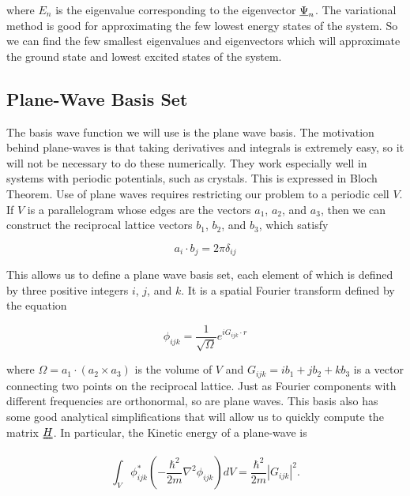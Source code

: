 \documentclass[12pt, a4paper, twocolumn]{article}
\begin{document}

where $E_n$ is the eigenvalue corresponding to the eigenvector $\uline{\Psi}_n$. The variational method is good for approximating the few lowest energy states of the system. So we can find the few smallest eigenvalues and eigenvectors which will approximate the ground state and lowest excited states of the system.

\subsection{Plane-Wave Basis Set}

The basis wave function we will use is the plane wave basis. The motivation behind plane-waves is that taking derivatives and integrals is extremely easy, so it will not be necessary to do these numerically. They work especially well in systems with periodic potentials, such as crystals. This is expressed in Bloch Theorem. Use of plane waves requires restricting our problem to a periodic cell $V$. If $V$ is a parallelogram whose edges are the vectors $a_1$, $a_2$, and $a_3$, then we can construct the reciprocal lattice vectors $b_1$, $b_2$, and $b_3$, which satisfy

\begin{equation}
a_{i}\cdot b_{j} = 2\pi\delta_{ij}
\end{equation}

This allows us to define a plane wave basis set, each element of which is defined by three positive integers $i$, $j$, and $k$. It is a spatial Fourier transform defined by the equation


\begin{equation}
\phi_{ijk}= \frac{1}{\sqrt{\Omega}} e^{iG_{ijk}\cdot r}
\end{equation}

where $\Omega=a_1\cdot(a_2\times a_3)$ is the volume of $V$ and
$G_{ijk} = ib_1 + jb_2 + kb_3$ is a vector connecting two points on the reciprocal lattice. Just as Fourier components with different frequencies are orthonormal, so are plane waves. This basis also has some good analytical simplifications that will allow us to quickly compute the matrix $\uuline{H}$. In particular, the Kinetic energy of a plane-wave is 

\begin{equation}
\int_{V} \phi_{ijk}^* \left( -\frac{\hbar^2}{2m}\nabla ^2 \phi_{ijk}\right) dV = \frac{\hbar^2}{2m} |G_{ijk}|^2.
\end{equation}
\end{document}
